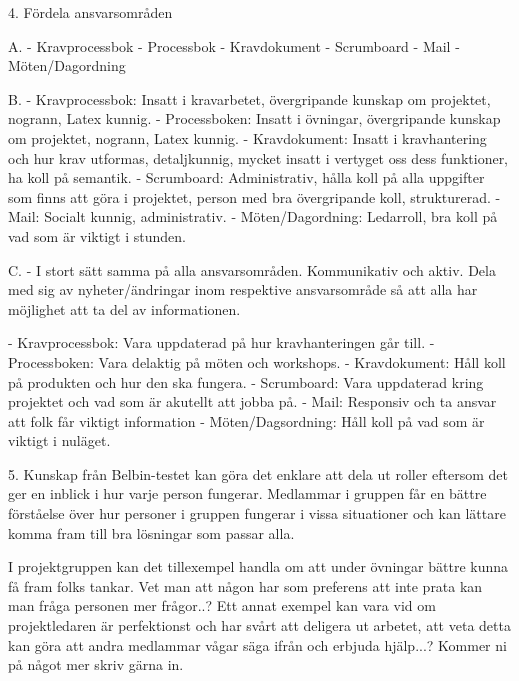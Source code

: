4. Fördela ansvarsområden

    A. 
        - Kravprocessbok 
        - Processbok
        - Kravdokument
        - Scrumboard
        - Mail
        - Möten/Dagordning
    
    B.
        - Kravprocessbok: Insatt i kravarbetet, övergripande kunskap om projektet, nogrann, Latex kunnig.
        - Processboken: Insatt i övningar, övergripande kunskap om projektet, nogrann, Latex kunnig.
        - Kravdokument: Insatt i kravhantering och hur krav utformas, detaljkunnig, mycket insatt i vertyget oss dess funktioner, ha koll på semantik.
        - Scrumboard: Administrativ, hålla koll på alla uppgifter som finns att göra i projektet, person med bra övergripande koll, strukturerad.
        - Mail: Socialt kunnig, administrativ.
        - Möten/Dagordning: Ledarroll, bra koll på vad som är viktigt i stunden.
        
    C.
        - I stort sätt samma på alla ansvarsområden. Kommunikativ och aktiv. Dela med sig av nyheter/ändringar inom respektive ansvarsområde så att alla har möjlighet att ta del av informationen. 
        
        - Kravprocessbok: Vara uppdaterad på hur kravhanteringen går till.
        - Processboken: Vara delaktig på möten och workshops. 
        - Kravdokument: Håll koll på produkten och hur den ska fungera.
        - Scrumboard: Vara uppdaterad kring projektet och vad som är akutellt att jobba på. 
        - Mail: Responsiv och ta ansvar att folk får viktigt information
        - Möten/Dagsordning: Håll koll på vad som är viktigt i nuläget.
        
5. 
    Kunskap från Belbin-testet kan göra det enklare att dela ut roller eftersom det ger en inblick i hur varje person fungerar. Medlammar i gruppen får en bättre förståelse över hur personer i gruppen fungerar i vissa situationer och kan lättare komma fram till bra lösningar som passar alla. 
    
    I projektgruppen kan det tillexempel handla om att under övningar bättre kunna få fram folks tankar. Vet man att någon har som preferens att inte prata kan man fråga personen mer frågor..? Ett annat exempel kan vara vid om projektledaren är perfektionst och har svårt att deligera ut arbetet, att veta detta kan göra att andra medlammar vågar säga ifrån och erbjuda hjälp...? Kommer ni på något mer skriv gärna in. 
    